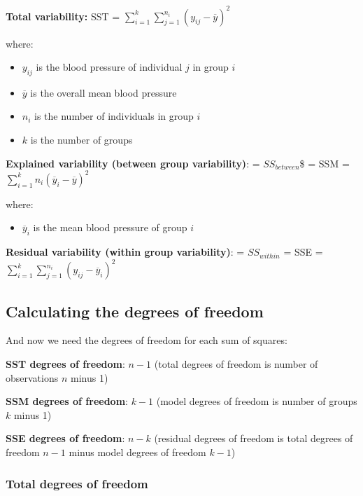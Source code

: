 \documentclass[
  letterpaper,
  8pt,
  a4paper]{book}
\providecommand{\tightlist}{%
  \setlength{\itemsep}{0pt}\setlength{\parskip}{0pt}}
\begin{document}
\textbf{Total variability:} SST =
\(\sum_{i=1}^k \sum_{j=1}^{n_i} (y_{ij}-\overline{y})^2\)

where:

\begin{itemize}
\tightlist
\item
  \(y_{ij}\) is the blood pressure of individual \(j\) in group \(i\)
\item
  \(\overline{y}\) is the overall mean blood pressure
\item
  \(n_i\) is the number of individuals in group \(i\)
\item
  \(k\) is the number of groups
\end{itemize}

\textbf{Explained variability (between group variability)}: =
\(SS_{between}\)\$ = SSM =
\(\sum_{i=1}^k n_i (\overline{y}_{i} - \overline{y})^2\)

where:

\begin{itemize}
\tightlist
\item
  \(\overline{y}_{i}\) is the mean blood pressure of group \(i\)
\end{itemize}

\textbf{Residual variability (within group variability)}: =
\(SS_{within}\) = SSE =
\(\sum_{i=1}^k \sum_{j=1}^{n_i}  (y_{ij} - \overline{y}_{i} )^2\)

\subsection*{Calculating the degrees of
freedom}\label{calculating-the-degrees-of-freedom}

And now we need the degrees of freedom for each sum of squares:

\textbf{SST degrees of freedom}: \(n - 1\) (total degrees of freedom is
number of observations \(n\) minus 1)

\textbf{SSM degrees of freedom}: \(k - 1\) (model degrees of freedom is
number of groups \(k\) minus 1)

\textbf{SSE degrees of freedom}: \(n - k\) (residual degrees of freedom
is total degrees of freedom \(n - 1\) minus model degrees of freedom
\(k - 1\))

\subsubsection*{Total degrees of
freedom}\label{total-degrees-of-freedom}
\end{document}
